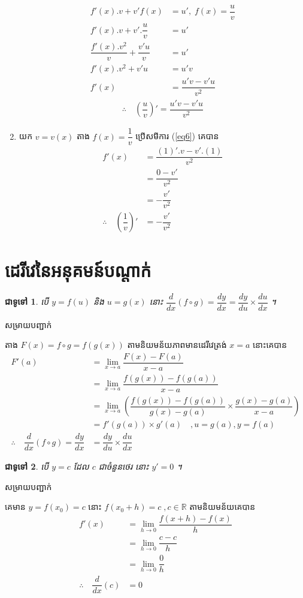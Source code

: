 \documentclass[12pt,fleqn]{book} %
\newtheorem{general}{\kml ជាទូទៅ}
\newcommand{\solution}{{\begin{center}\kml \color{blue} សម្រាយបញ្ជាក់\end{center} }}
\newcommand{\R}{\mathbb{R}}
\begin{document}
\begin{enumerate}
\begin{align*}
f'(x).v+v'f(x)&=u' ,\; f(x)=\dfrac{u}{v}\\
f'(x).v+v'. \dfrac{u}{v}&=u'\\
\dfrac{f'(x).v^2}{v}+\dfrac{v'u}{v}&=u'\\
f'(x).v^2+v'u&=u'v\\
  f'(x)&=\dfrac{u'v-v'u}{v^2}
\end{align*}
\begin{align}\label{eq6}
\therefore\quad\left(\dfrac{u}{v}\right)'=\dfrac{u'v-v'u}{v^2}
\end{align}
\item យក $v=v(x)$ តាង $f(x)=\dfrac{1}{v}$ ប្រើសមីការ (\ref{eq6}) គេបាន 
\begin{align*}
f'(x)&=\dfrac{(1)'.v-v'.(1)}{v^2}\\
&=\dfrac{0-v'}{v^2}\\
&=-\dfrac{v'}{v^2}\\
\therefore \quad\left( \dfrac{1}{v}\right)'&=-\dfrac{v'}{v^2}
\end{align*}

 \end{enumerate}
 \section{ដេរីវេនៃអនុគមន៍បណ្តាក់}
 \begin{general}
 បើ $y=f(u)$ និង $u=g(x)$ នោះ $\dfrac{d}{dx}(f \circ g)=\dfrac{dy}{dx}=\dfrac{dy}{du}\times \dfrac{du}{dx}$  ។ 
 \end{general}
 \solution តាង $F(x)=f\circ g=f(g(x))$  តាមនិយមន័យភាពមានដេរីវេត្រង់ $x=a$ នោះគេបាន 
 \begin{align*}
 F'(a)&=\lim_{x\to a}\dfrac{F(x)-F(a)}{x-a}\\
 &=\lim _{x\to a}\dfrac{f(g(x))-f(g(a))}{x-a}\\
 &=\lim_{x\to a}\left( \dfrac{f(g(x))-f(g(a))}{g(x)-g(a)} \times \dfrac{g(x)-g(a)}{x-a}\right)\\
 &=f'(g(a))\times g'(a)\quad,u=g(a),y=f(a)\\
 \therefore \quad \dfrac{d}{dx}(f\circ g)=\dfrac{dy}{dx}&=\dfrac{dy}{du}\times \dfrac{du}{dx}
 \end{align*}
 
\begin{general}
បើ $y=c$ ដែល $c$ ជាចំនួនថេរ នោះ $y'=0$ ។  
\end{general}
\solution 
គេមាន $y=f(x_0)=c$ នោះ $f(x_0+h)=c \;, c\in \R$
តាមនិយមន័យគេបាន 
\begin{align*}
f'(x)&=\lim_{h\to 0}\dfrac{f(x+h)-f(x)}{h}\\
&=\lim_{h\to 0}\dfrac{c-c}{h}\\
&=\lim_{h\to 0}\dfrac{0}{h}\\
\therefore \quad \dfrac{d}{dx}(c)&=0
\end{align*}
\end{document}
